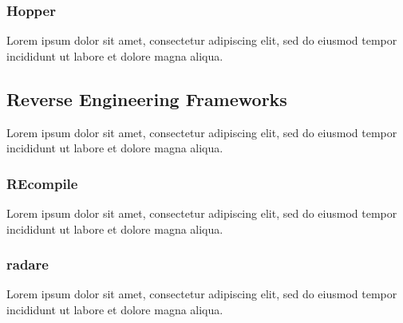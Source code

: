 \documentclass[12pt, a4paper]{article}
\begin{document}
\cite{retargetable_decomp}


\subsubsection{Hopper}


Lorem ipsum dolor sit amet, consectetur adipiscing elit, sed do eiusmod tempor incididunt ut labore et dolore magna aliqua.


\subsection{Reverse Engineering Frameworks}

Lorem ipsum dolor sit amet, consectetur adipiscing elit, sed do eiusmod tempor incididunt ut labore et dolore magna aliqua.


\subsubsection{REcompile}

Lorem ipsum dolor sit amet, consectetur adipiscing elit, sed do eiusmod tempor incididunt ut labore et dolore magna aliqua.

\cite{recompile}


\subsubsection{radare}

Lorem ipsum dolor sit amet, consectetur adipiscing elit, sed do eiusmod tempor incididunt ut labore et dolore magna aliqua.

\cite{radare}

\pagebreak

\end{document}
